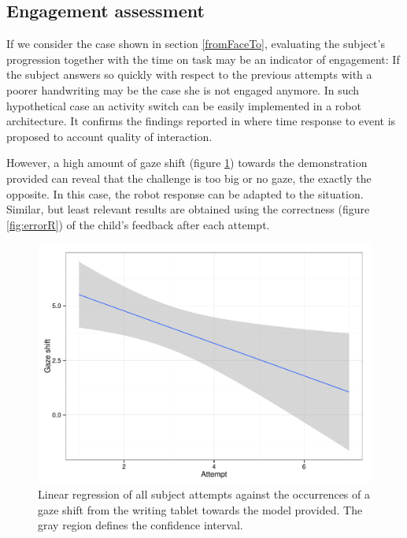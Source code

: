 \documentclass{sig-alternate}
\begin{document}
\subsection{Engagement assessment}
If we consider the case shown in section \ref{fromFaceTo}, evaluating the subject's progression together with the time on task may be an indicator of engagement: If the subject answers so quickly with respect to the previous attempts with a poorer handwriting may be the case she is not engaged anymore. In such hypothetical case an activity switch can be easily implemented in a robot architecture. It confirms the findings reported in \cite{anzalone} where time response to event is proposed to account quality of interaction. 
        
However, a high amount of gaze shift (figure \ref{fig:gazeR}) towards the demonstration provided can reveal that the challenge is too big or no gaze, the exactly the opposite. In this case, the robot response can be adapted to the situation. Similar, but least relevant results are obtained using the correctness (figure \ref{fig:errorR}) of the child's feedback after each attempt. 

\begin{figure}
    \centering
    \includegraphics[width=0.9\columnwidth]{gazeR}
    \caption{\small Linear regression of all subject attempts against the occurrences of a gaze shift from the writing tablet towards the model provided. The gray region defines the confidence interval.}
    \label{fig:gazeR}
\end{figure}
\end{document}
